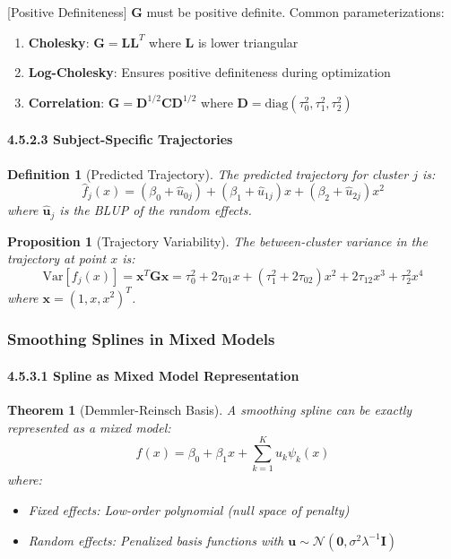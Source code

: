 \documentclass{article}
\newtheorem{definition}{Definition}
\newtheorem{theorem}{Theorem}
\newtheorem{proposition}{Proposition}
\begin{document}
[Positive Definiteness]
$\mathbf{G}$ must be positive definite. Common parameterizations:
\begin{enumerate}
    \item \textbf{Cholesky}: $\mathbf{G} = \mathbf{L}\mathbf{L}^T$ where $\mathbf{L}$ is lower triangular
    \item \textbf{Log-Cholesky}: Ensures positive definiteness during optimization
    \item \textbf{Correlation}: $\mathbf{G} = \mathbf{D}^{1/2}\mathbf{C}\mathbf{D}^{1/2}$ where $\mathbf{D} = \text{diag}(\tau_0^2, \tau_1^2, \tau_2^2)$
\end{enumerate}


\paragraph{4.5.2.3 Subject-Specific Trajectories}

\begin{definition}[Predicted Trajectory]
The predicted trajectory for cluster $j$ is:
\begin{equation}
\hat{f}_j(x) = (\beta_0 + \hat{u}_{0j}) + (\beta_1 + \hat{u}_{1j})x + (\beta_2 + \hat{u}_{2j})x^2
\end{equation}
where $\hat{\mathbf{u}}_j$ is the BLUP of the random effects.
\end{definition}

\begin{proposition}[Trajectory Variability]
The between-cluster variance in the trajectory at point $x$ is:
\begin{equation}
\text{Var}[f_j(x)] = \mathbf{x}^T\mathbf{G}\mathbf{x} = \tau_0^2 + 2\tau_{01}x + (\tau_1^2 + 2\tau_{02})x^2 + 2\tau_{12}x^3 + \tau_2^2x^4
\end{equation}
where $\mathbf{x} = (1, x, x^2)^T$.
\end{proposition}

\subsubsection{Smoothing Splines in Mixed Models}

\paragraph{4.5.3.1 Spline as Mixed Model Representation}

\begin{theorem}[Demmler-Reinsch Basis]
A smoothing spline can be exactly represented as a mixed model:
\begin{equation}
f(x) = \beta_0 + \beta_1 x + \sum_{k=1}^K u_k \psi_k(x)
\end{equation}
where:
\begin{itemize}
    \item Fixed effects: Low-order polynomial (null space of penalty)
    \item Random effects: Penalized basis functions with $\mathbf{u} \sim \mathcal{N}(\mathbf{0}, \sigma^2\lambda^{-1}\mathbf{I})$
\end{itemize}
\end{theorem}
\end{document}
